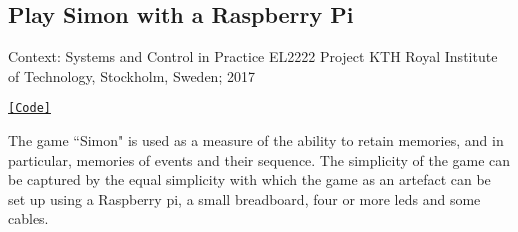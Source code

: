 \subsection{Play Simon with a Raspberry Pi}

\noindent Context: Systems and Control in Practice EL2222 Project
\noindent KTH Royal Institute of Technology, Stockholm, Sweden; 2017

\noindent \href{https://github.com/li9i/EL2222_Project}{\texttt{[Code]}}

The game ``Simon" is used as a measure of the ability to retain memories, and in
particular, memories of events and their sequence. The simplicity of the game
can be captured by the equal simplicity with which the game as an artefact can
be set up using a Raspberry pi, a small breadboard, four or more leds
and some cables.
